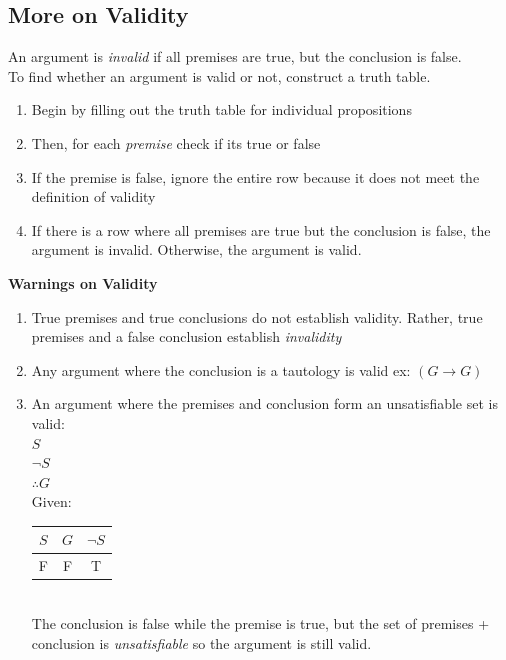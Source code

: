 \documentclass[]{article}
\begin{document}
\subsection{More on Validity}
An argument is \textit{invalid} if all premises are true, but the conclusion is false.\\
To find whether an argument is valid or not, construct a truth table. 
\begin{enumerate}
	\item{Begin by filling out the truth table for individual propositions}
	\item{Then, for each \textit{premise} check if its true or false}
	\item{If the premise is false, ignore the entire row because it does not meet the definition of validity}
	\item{If there is a row where all premises are true but the conclusion is false, the argument is invalid. Otherwise, the argument is valid.}
\end{enumerate}
\textbf{Warnings on Validity}
\begin{enumerate}
	\item{True premises and true conclusions do not establish validity.
	Rather, true premises and a false conclusion establish \textit{invalidity}}
	\item Any argument where the conclusion is a tautology is valid ex: $(G \rightarrow G)$
	\item An argument where the premises and conclusion form an unsatisfiable set is valid:\\
	$S$\\
	$\neg S$\\
	$\therefore G$\vspace{5pt}\\
	Given:\vspace{5pt}\\
	\begin{tabular}{|c|c|c|}
		\hline
		$S$ & $G$ & $\neg{S}$\\
		\hline
		F & F & T\\
		\hline
	\end{tabular}\vspace{5pt}\\
	The conclusion is false while the premise is true, but the set of premises + conclusion is \textit{unsatisfiable} so the argument is still valid.
\end{enumerate}
\end{document}
